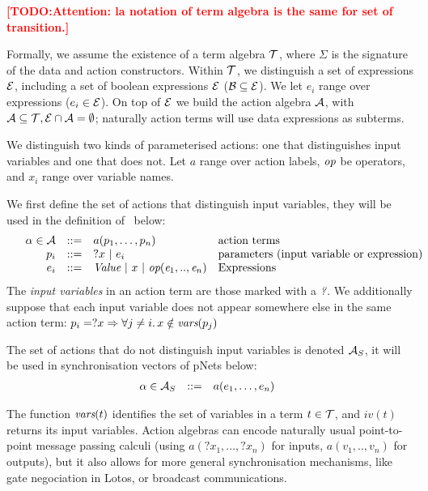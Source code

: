 \documentclass{lncs/llncs}
\newcommand{\TODO}[1]{\textcolor{red}{\textbf{[TODO:#1]}}}
\begin{document}
\TODO{Attention: la notation of term algebra is the same for set of transition.}

Formally, we assume the existence of a term algebra $\mathcal{T}$,
where $\Sigma$ is the signature of the data and action constructors. Within $\mathcal{T}$, we distinguish a set of
 expressions $\mathcal{E}$, including a set of boolean
expressions $\mathcal{E}$ ($\mathcal{B}\subseteq\mathcal{E}$). We let $e_i$ range over expressions ($e_i\in\mathcal{E}$).
On top of $\mathcal{E}$ we build the action algebra
$\mathcal{A}$, with $\mathcal{A}\subseteq\mathcal{T},
\mathcal{E}\cap\mathcal{A}=\emptyset$;
naturally action terms will use data expressions as subterms.

We distinguish two kinds of parameterised actions: one that distinguishes input variables and one that does not. Let $a$
range over action labels, $\symb{op}$ be operators, and $x_i$ range over
variable names.

We first define the set of actions that distinguish input variables, they will be used in the definition of \pLTS\ below:
\[
\begin{array}[l]{rcl@{\quad}p{5.5cm}}
  \alpha\in\AlgA&::=&a(p_1,\ldots,p_n)&\text{action terms}\\
  p_i&::=& ?x~|~e_i&\text{parameters (input variable or expression)}\\
  e_i&::=& \symb{Value}~|~x~|~\symb{op}(\symb{e}_1,..,\symb{e}_n)&\text{Expressions}
\end{array}
\]
The \emph{input variables} in an action term are those marked with a
$\symb{?}$.
We additionally suppose that each input variable does not
appear somewhere else in the same action term:
$p_i=?x\Rightarrow\forall j\neq i.\, x\notin \vars(p_j)$

The set of actions that do not distinguish input variables is denoted $\mathcal{A}_S$, it will be used in synchronisation vectors of pNets below:
\[\begin{array}[l]{rcl@{\quad}l}
  \alpha\in \AlgAS &::=&a(e_1,\ldots,e_n)
\end{array}
\]

The function
$\vars(t)$ identifies the set of variables in a term
$t\in\mathcal{T}$, and $iv(t)$ returns its input variables.
Action algebras can encode naturally usual point-to-point message passing calculi (using 
$a(?x_1,...,?x_n)$ for inputs, $a(v_1,..,v_n)$ for outputs), but it also allows
for more general synchronisation mechanisms, like gate negociation in Lotos, or broadcast
communications. 
\end{document}
